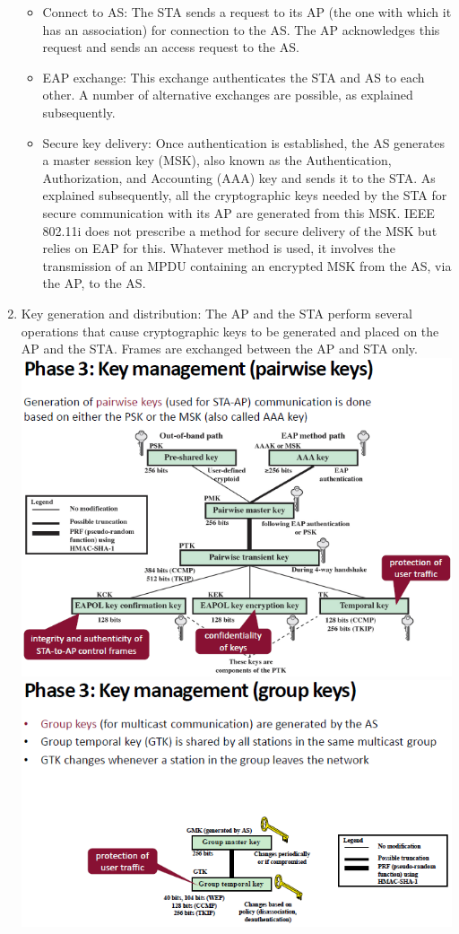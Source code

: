 \documentclass[12pt]{article}
\begin{document}
\begin{enumerate}
 	\begin{itemize}
 		\item Connect to AS: The STA sends a request to its AP (the one with which it has an association) for connection to the AS. The AP acknowledges this request and sends an access request to the AS.
 		\item EAP exchange: This exchange authenticates the STA and AS to each other. A number of alternative exchanges are possible, as explained subsequently.
 		\item Secure key delivery: Once authentication is established, the AS generates a master session key (MSK), also known as the Authentication, Authorization, and Accounting (AAA) key and sends it to the STA. As explained subsequently, all the cryptographic keys needed by the STA for secure communication with its AP are generated from this MSK. IEEE 802.11i does not prescribe a method for secure delivery of the MSK but relies on EAP for this. Whatever method is used, it involves the transmission of an MPDU containing an encrypted MSK from the AS, via the AP, to the AS.
 	\end{itemize}
 	\item Key generation and distribution: The AP and the STA perform several operations that cause cryptographic keys to be generated and placed on the AP and the STA. Frames are exchanged between the AP and STA only.\\
 	\includegraphics[width=\linewidth]{./slides/L7P1WPA2PH31.png}\\
 	\includegraphics[width=\linewidth]{./slides/L7P1WPA2PH32.PNG}\\

\end{enumerate}
\end{document}
